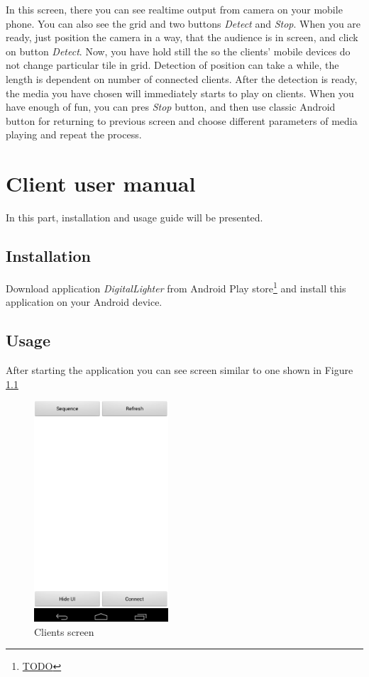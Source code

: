 In this screen, there you can see realtime output from camera on your mobile phone.
You can also see the grid and two buttons \emph{Detect} and \emph{Stop}.
When you are ready, just position the camera in a way, that the audience is in screen, and click on button \emph{Detect}.
Now, you have hold still the so the clients' mobile devices do not change particular tile in grid.
Detection of position can take a while, the length is dependent on number of connected clients.
After the detection is ready, the media you have chosen will immediately starts to play on clients.
When you have enough of fun, you can pres \emph{Stop} button, and then use classic Android button for returning to previous screen and choose different parameters of media playing and repeat the process.

\chapter{Client user manual}
In this part, installation and usage guide will be presented.
\section{Installation}
Download application \emph{DigitalLighter} from Android Play store\footnote{\url{TODO}} and install this application on your Android device.
\section{Usage}
After starting the application you can see screen similar to one shown in Figure \ref{fig:manual_client}

\begin{figure}[h]
	\centering
		\includegraphics[width=5cm]{appendix/client1.png}
	\caption{Clients screen}
	\label{fig:manual_client}
\end{figure}

